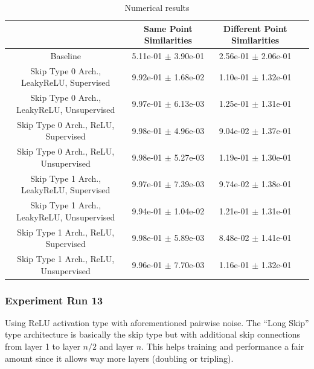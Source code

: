 \documentclass[a4paper]{article}
\begin{document}
\begin{table}[H]
  \caption{Numerical results}
      \begin{tabular}{|c|c|c|c|} \hline
                                      &  Same Point Similarities  &  Different Point Similarities  \\ \hline
Baseline   & 5.11e-01 $\pm$ 3.90e-01 & 2.56e-01 $\pm$ 2.06e-01 \\ \hline
Skip Type 0 Arch., LeakyReLU, Supervised   & 9.92e-01 $\pm$ 1.68e-02 & 1.10e-01 $\pm$ 1.32e-01 \\ \hline
Skip Type 0 Arch., LeakyReLU, Unsupervised   & 9.97e-01 $\pm$ 6.13e-03 & 1.25e-01 $\pm$ 1.31e-01 \\ \hline
Skip Type 0 Arch., ReLU, Supervised   & 9.98e-01 $\pm$ 4.96e-03 & 9.04e-02 $\pm$ 1.37e-01 \\ \hline
Skip Type 0 Arch., ReLU, Unsupervised   & 9.98e-01 $\pm$ 5.27e-03 & 1.19e-01 $\pm$ 1.30e-01 \\ \hline
Skip Type 1 Arch., LeakyReLU, Supervised   & 9.97e-01 $\pm$ 7.39e-03 & 9.74e-02 $\pm$ 1.38e-01 \\ \hline
Skip Type 1 Arch., LeakyReLU, Unsupervised   & 9.94e-01 $\pm$ 1.04e-02 & 1.21e-01 $\pm$ 1.31e-01 \\ \hline
Skip Type 1 Arch., ReLU, Supervised   & 9.98e-01 $\pm$ 5.89e-03 & 8.48e-02 $\pm$ 1.41e-01 \\ \hline
Skip Type 1 Arch., ReLU, Unsupervised   & 9.96e-01 $\pm$ 7.70e-03 & 1.16e-01 $\pm$ 1.32e-01 \\ \hline
      \end{tabular}
      \label{fig:12_tab1}
\end{table}



\subsubsection*{Experiment Run 13}
Using ReLU activation type with aforementioned pairwise noise. 
The ``Long Skip'' type architecture is basically the skip type but with additional skip connections from layer 1 to layer $n/2$ and layer $n$.
This helps training and performance a fair amount since it allows way more layers (doubling or tripling). 
\end{document}
